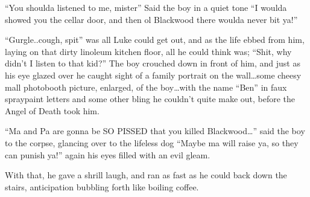 ``You shoulda listened to me, mister'' Said the boy in a quiet tone
``I woulda showed you the cellar door, and then ol Blackwood there
woulda never bit ya!''

``Gurgle..cough, spit'' was all Luke could get out, and as the life
ebbed from him, laying on that dirty linoleum kitchen floor, all he
could think was; ``Shit, why didn't I listen to that kid?'' The boy
crouched down in front of him, and just as his eye glazed over he
caught sight of a family portrait on the wall{\ldots}some cheesy mall
photobooth picture, enlarged, of the boy{\ldots}with the name ``Ben'' in
faux spraypaint letters and some other bling he couldn't quite make
out, before the Angel of Death took him.

``Ma and Pa are gonna be SO PISSED that you killed Blackwood{\ldots}''
said the boy to the corpse, glancing over to the lifeless dog
``Maybe ma will raise ya, so they can punish ya!'' again his eyes
filled with an evil gleam.

With that, he gave a shrill laugh, and ran as fast as he could back
down the stairs, anticipation bubbling forth like boiling coffee. 

 



